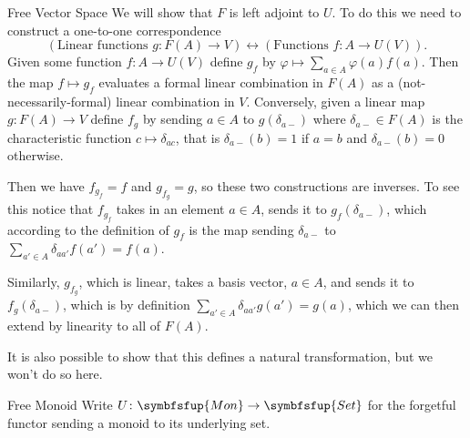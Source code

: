 \documentclass[fleqn]{NotesClass}
\makeatletter
\newcommand{\c@egory}[1]{\symbfsfup{#1}}
\newcommand{\Set}{\c@egory{Set}}
\newcommand{\Mon}{\c@egory{Mon}}
\makeatother
\begin{document}
\begin{appendices}
\begin{exm}{Free Vector Space}{}
            We will show that \(F\) is left adjoint to \(U\).
            To do this we need to construct a one-to-one correspondence
            \begin{equation}
                (\text{Linear functions } g\colon F(A) \to V) \leftrightarrow (\text{Functions } f\colon A \to U(V)).
            \end{equation}
            Given some function \(f\colon A \to U(V)\) define \(g_f\) by \(\varphi \mapsto \sum_{a\in A} \varphi(a)f(a)\).
            Then the map \(f \mapsto g_f\) evaluates a formal linear combination in \(F(A)\) as a (not-necessarily-formal) linear combination in \(V\).
            Conversely, given a linear map \(g \colon F(A) \to V\) define \(f_g\) by sending \(a \in A\) to \(g(\delta_{a-})\) where \(\delta_{a-} \in F(A)\) is the characteristic function \(c \mapsto \delta_{ac}\), that is \(\delta_{a-}(b) = 1\) if \(a = b\) and \(\delta_{a-}(b) = 0\) otherwise.
            
            Then we have \(f_{g_f} = f\) and \(g_{f_g} = g\), so these two constructions are inverses.
            To see this notice that \(f_{g_f}\) takes in an element \(a \in A\), sends it to \(g_f(\delta_{a-})\), which according to the definition of \(g_f\) is the map sending \(\delta_{a-}\) to \(\sum_{a' \in A} \delta_{aa'} f(a') = f(a)\).
            
            Similarly, \(g_{f_g}\), which is linear, takes a basis vector, \(a \in A\), and sends it to \(f_g(\delta_{a-})\), which is by definition \(\sum_{a' \in A} \delta_{aa'}g(a') = g(a)\), which we can then extend by linearity to all of \(F(A)\).
            
            It is also possible to show that this defines a natural transformation, but we won't do so here.
        \end{exm}
        
        \begin{exm}{Free Monoid}{}
            Write \(U \colon \Mon \to \Set\) for the forgetful functor sending a monoid to its underlying set.
            

\end{exm}
\end{appendices}
\end{document}
